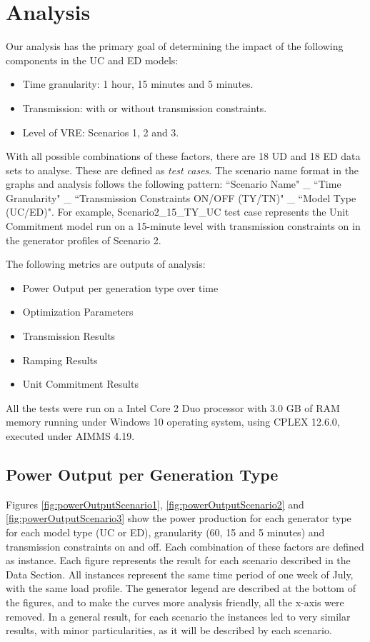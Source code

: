 \documentclass[12pt,LUDisStyle,twosided]{book}
\begin{document}
\chapter{Analysis}

Our analysis has the primary goal of determining the impact of the following components in the UC and ED models:

\begin{itemize}
\item Time granularity: 1 hour, 15 minutes and 5 minutes.
\item Transmission: with or without transmission constraints.
\item Level of VRE: Scenarios 1, 2 and 3.
\end{itemize}

With all possible combinations of these factors, there are 18 UD and 18 ED data sets to analyse. These are defined as \textit{test cases}. The scenario name format in the graphs and analysis follows the following pattern:
``Scenario Name" \_ ``Time Granularity" \_ ``Transmission Constraints ON/OFF (TY/TN)" \_ ``Model Type (UC/ED)". For example, Scenario2\_15\_TY\_UC test case represents the Unit Commitment model run on a 15-minute level with transmission constraints on in the generator profiles of Scenario 2.

The following metrics are outputs of analysis:

\begin{itemize}
\item Power Output per generation type over time
\item Optimization Parameters
\item Transmission Results
\item Ramping Results
\item Unit Commitment Results
\end{itemize}

All the tests were run on a Intel Core 2 Duo processor with 3.0 GB of RAM memory running under Windows 10 operating system, using CPLEX 12.6.0, executed under AIMMS 4.19.


\section{Power Output per Generation Type}

Figures \ref{fig:powerOutputScenario1}, \ref{fig:powerOutputScenario2} and \ref{fig:powerOutputScenario3} show the power production for each generator type for each model type (UC or ED), granularity (60, 15 and 5 minutes) and transmission constraints on and off. Each combination of these factors are defined as instance. Each figure represents the result for each scenario described in the Data Section. All instances represent the same time period of one week of July, with the same load profile. The generator legend are described at the bottom of the figures, and to make the curves more analysis friendly, all the x-axis were removed. In a general result, for each scenario the instances led to very similar results, with minor particularities, as it will be described by each scenario.
\end{document}

